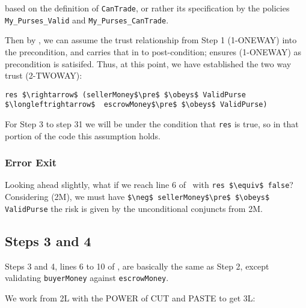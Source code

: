 \noindent based on the definition of \lstinline+CanTrade+, or rather
its specification by the policies \lstinline+My_Purses_Valid+ and
\lstinline+My_Purses_CanTrade+. 

Then by , we can assume
the trust relationship from Step 1 (1-ONEWAY) into the precondition,
and  carries that in to post-condition;
 ensures (1-ONEWAY) as precondition is satisifed.
Thus, at this point, we have established the two way trust (2-TWOWAY):

\begin{lstlisting}[backgroundcolor=\color{red}]
res $\rightarrow$ (sellerMoney$\pre$ $\obeys$ ValidPurse $\longleftrightarrow$  escrowMoney$\pre$ $\obeys$ ValidPurse)
\end{lstlisting}

For Step 3 to step 31 we will be under the condition that
\lstinline+res+ is true, so in that portion of the code this
assumption holds.

\subsubsection{Error Exit}

Looking ahead slightly, what if we reach line 6 of \bothfigs\ with
%
\lstinline+res $\equiv$ false+?
%
Considering (2M), we must have
%
\lstinline+$\neg$ sellerMoney$\pre$ $\obeys$ ValidPurse+
%
the risk is given by the unconditional conjuncts from 2M.

\subsection{Steps 3 and 4}

Steps 3 and 4, lines 6 to 10 of \bothfigs, are basically the same as Step 2, except validating
\lstinline+buyerMoney+ against \lstinline+escrowMoney+.


We work from 2L with the POWER of CUT and PASTE to get 3L:

